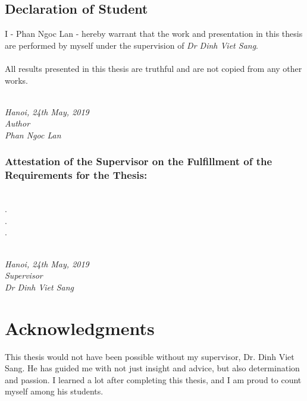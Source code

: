 \documentclass[a4paper, 12pt, oneside]{report}
\begin{document}
\begin{spacing}{1.0}
    \section*{Declaration of Student}
    I - Phan Ngoc Lan - hereby warrant that the work and presentation in this thesis are performed by myself under the supervision of \textit{Dr Dinh Viet Sang}.\\\\
    All results presented in this thesis are truthful and are not copied from any other works.\\\\
    \begin{minipage}{0.5\textwidth}
        \hfill
    \end{minipage}
    \begin{minipage}[t]{0.5\textwidth}
        \begin{center}
        \textit{Hanoi, 24th May, 2019\\Author\\[1cm]Phan Ngoc Lan}
        \end{center}
    \end{minipage}
    \subsection*{Attestation of the Supervisor on the Fulfillment of the
    Requirements for the Thesis:}
    \dotfill\\.\dotfill\\.\dotfill\\.\dotfill\\\\
    \begin{minipage}{0.5\textwidth}
        \hfill
    \end{minipage}
    \begin{minipage}[t]{0.5\textwidth}
        \begin{center}
    \textit{Hanoi, 24th May, 2019\\Supervisor\\[1cm]Dr Dinh Viet Sang}
        \end{center}
    \end{minipage}
\end{spacing}

\chapter*{Acknowledgments}
This thesis would not have been possible without my supervisor, Dr. Dinh Viet Sang. He has guided me with not just insight and advice, but also determination and passion. I learned a lot after completing this thesis, and I am proud to count myself among his students.
\end{document}
